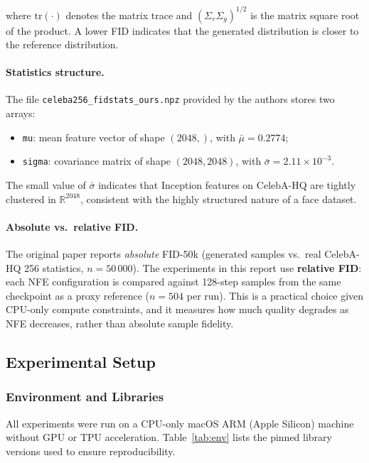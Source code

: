 \noindent where $\mathrm{tr}(\cdot)$ denotes the matrix trace and
$(\Sigma_r \Sigma_g)^{1/2}$ is the matrix square root of the product.
A lower FID indicates that the generated distribution is closer to the
reference distribution.

\paragraph{Statistics structure.}
The file \texttt{celeba256\_fidstats\_ours.npz} provided by the authors stores
two arrays:
\begin{itemize}
    \item \texttt{mu}: mean feature vector of shape $(2048,)$,
          with $\bar{\mu} = 0.2774$;
    \item \texttt{sigma}: covariance matrix of shape $(2048, 2048)$,
          with $\bar{\sigma} = 2.11 \times 10^{-3}$.
\end{itemize}

The small value of $\bar{\sigma}$ indicates that Inception features on
CelebA-HQ are tightly clustered in $\mathbb{R}^{2048}$, consistent with the
highly structured nature of a face dataset.

\paragraph{Absolute vs.\ relative FID.}
The original paper reports \emph{absolute} FID-50k (generated samples vs.\
real CelebA-HQ 256 statistics, $n = 50\,000$).
The experiments in this report use \textbf{relative FID}: each NFE
configuration is compared against 128-step samples from the same checkpoint as
a proxy reference ($n = 504$ per run).
This is a practical choice given CPU-only compute constraints, and it measures
how much quality degrades as NFE decreases, rather than absolute sample
fidelity.

\subsection{Experimental Setup}
\label{sec:setup}

\subsubsection{Environment and Libraries}

All experiments were run on a CPU-only macOS ARM (Apple Silicon) machine
without GPU or TPU acceleration.
Table~\ref{tab:env} lists the pinned library versions used to ensure
reproducibility.

